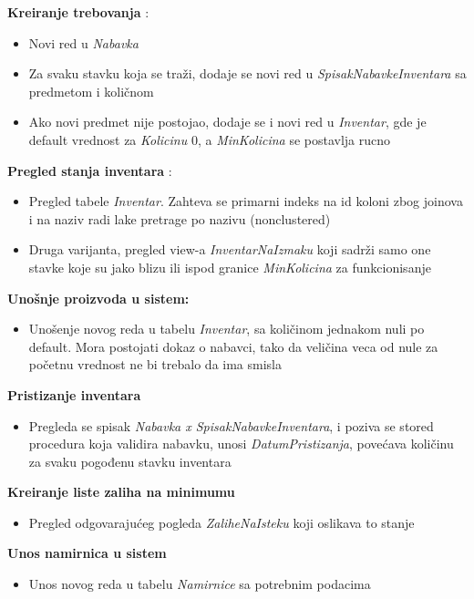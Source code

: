 \documentclass{article}
\begin{document}
\textbf{Kreiranje trebovanja} :
\begin{itemize}
\item Novi red u \emph{Nabavka}
\item Za svaku stavku koja se traži, dodaje se novi red u \emph{SpisakNabavkeInventara} sa predmetom i količnom
\item Ako novi predmet nije postojao, dodaje se i novi red u \emph{Inventar}, gde je default vrednost za \emph{Kolicinu} 0, a \emph{MinKolicina} se postavlja rucno
\end{itemize}


\textbf{Pregled stanja inventara} :
\begin{itemize}
\item Pregled tabele \emph{Inventar}. Zahteva se primarni indeks na id koloni zbog joinova i na naziv radi lake pretrage po nazivu (nonclustered)
\item Druga varijanta, pregled view-a \emph{InventarNaIzmaku} koji sadrži samo one stavke koje su jako blizu ili ispod granice \emph{MinKolicina} za funkcionisanje
\end{itemize}

\textbf{Unošnje proizvoda u sistem:}
\begin{itemize}
\item Unošenje novog reda u tabelu \emph{Inventar}, sa količinom jednakom nuli po default. Mora postojati dokaz o nabavci, tako da veličina veca od nule za početnu vrednost ne bi trebalo da ima smisla
\end{itemize}

\textbf{Pristizanje inventara}
\begin{itemize}
\item Pregleda se spisak \emph{Nabavka x SpisakNabavkeInventara}, i poziva se stored procedura koja validira nabavku, unosi \emph{DatumPristizanja}, povećava količinu za svaku pogođenu stavku inventara 
\end{itemize}

\textbf{Kreiranje liste zaliha na minimumu}
\begin{itemize}
\item Pregled odgovarajućeg pogleda \emph{ZaliheNaIsteku} koji oslikava to stanje 
\end{itemize}


\textbf{Unos namirnica u sistem}
\begin{itemize}
\item Unos novog reda u tabelu \emph{Namirnice} sa potrebnim podacima 
\end{itemize}
\end{document}
